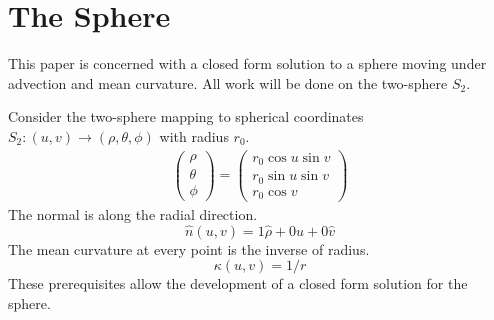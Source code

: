 \documentclass[journal]{IEEEtran}
\begin{document}
\section{The Sphere}
This paper is concerned with a closed form solution to a sphere moving under advection and mean curvature.
All work will be done on the two-sphere $S_2$.

Consider the two-sphere mapping to spherical coordinates $S_2 \colon (u,v) \rightarrow (\rho, \theta, \phi)$ with radius $r_0$.
\begin{align}
  \label{eqn:sphere:mapping}
  \begin{pmatrix}
    \rho \\
    \theta \\
    \phi
  \end{pmatrix} = 
  \begin{pmatrix}
    r_0 \cos u \sin v \\
    r_0 \sin u \sin v \\
    r_0 \cos v
  \end{pmatrix}
\end{align}
The normal is along the radial direction.
\begin{equation}
  \label{eqn:sphere:normal}
  \hat{n}(u,v) = 1\hat{\rho} + 0 \hat{u} + 0 \hat{v}
\end{equation}
The mean curvature at every point is the inverse of radius.
\begin{equation}
  \label{eqn:sphere:curvature}
  \kappa(u,v) = 1/r
\end{equation}
These prerequisites allow the development of a closed form solution for the sphere.
\end{document}
